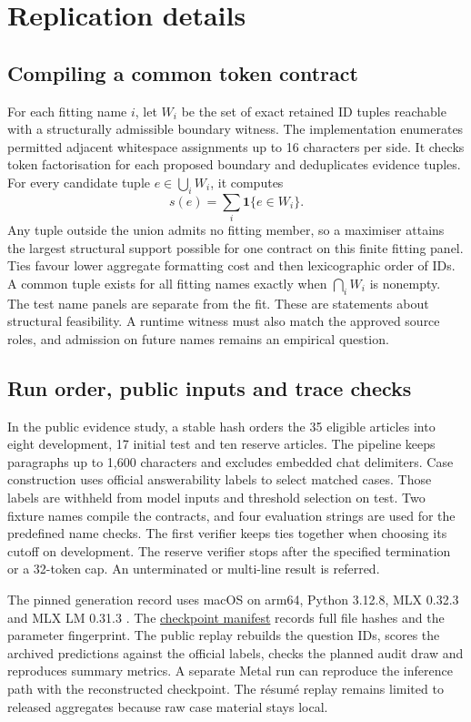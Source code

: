 \appendix
\section{Replication details}
\label{sec:replication}

\subsection{Compiling a common token contract}

For each fitting name \(i\), let \(W_i\) be the set of exact retained ID tuples reachable with a structurally admissible boundary witness. The implementation enumerates permitted adjacent whitespace assignments up to 16 characters per side. It checks token factorisation for each proposed boundary and deduplicates evidence tuples. For every candidate tuple \(e\in\bigcup_i W_i\), it computes
\[
  s(e) = \sum_i \mathbf{1}\{e\in W_i\}.
\]
Any tuple outside the union admits no fitting member, so a maximiser attains the largest structural support possible for one contract on this finite fitting panel. Ties favour lower aggregate formatting cost and then lexicographic order of IDs. A common tuple exists for all fitting names exactly when \(\bigcap_i W_i\) is nonempty. The test name panels are separate from the fit. These are statements about structural feasibility. A runtime witness must also match the approved source roles, and admission on future names remains an empirical question.

\subsection{Run order, public inputs and trace checks}

In the public evidence study, a stable hash orders the 35 eligible articles into eight development, 17 initial test and ten reserve articles. The pipeline keeps paragraphs up to 1,600 characters and excludes embedded chat delimiters. Case construction uses official answerability labels to select matched cases. Those labels are withheld from model inputs and threshold selection on test. Two fixture names compile the contracts, and four evaluation strings are used for the predefined name checks. The first verifier keeps ties together when choosing its cutoff on development. The reserve verifier stops after the specified termination or a 32-token cap. An unterminated or multi-line result is referred.

The pinned generation record uses macOS on arm64, Python 3.12.8, MLX 0.32.3 and MLX LM 0.31.3 \citep{mlxproj}. The \href{https://github.com/adelmansourjr/racial-bias-ai-calibration/blob/d51b96f96982bc41a42b368af6d38d459b2a95d5/nameguard-risk-study/audit/checkpoint-manifest.json}{checkpoint manifest} records full file hashes and the parameter fingerprint. The public replay rebuilds the question IDs, scores the archived predictions against the official labels, checks the planned audit draw and reproduces summary metrics. A separate Metal run can reproduce the inference path with the reconstructed checkpoint. The résumé replay remains limited to released aggregates because raw case material stays local.

